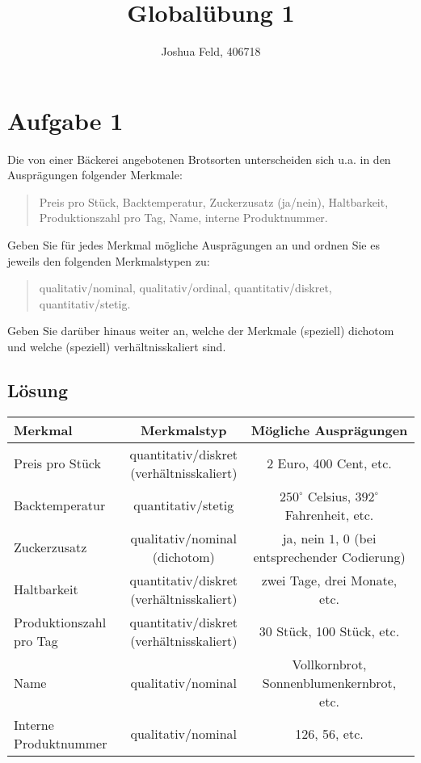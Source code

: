 \documentclass{exercise}
\institute{Institut für Statistik und Wirtschaftsmathematik}
\title{Globalübung 1}
\author{Joshua Feld, 406718}
\begin{document}
    \maketitle


    \section*{Aufgabe 1}

    \begin{problem}
        Die von einer Bäckerei angebotenen Brotsorten unterscheiden sich u.a. in den Ausprägungen folgender Merkmale:
        \begin{quote}
            Preis pro Stück, Backtemperatur, Zuckerzusatz (ja/nein), Haltbarkeit, Produktionszahl pro Tag, Name, interne Produktnummer.
        \end{quote}
        Geben Sie für jedes Merkmal mögliche Ausprägungen an und ordnen Sie es jeweils den folgenden Merkmalstypen zu:
        \begin{quote}
            qualitativ/nominal, qualitativ/ordinal, quantitativ/diskret, quantitativ/stetig.
        \end{quote}
        Geben Sie darüber hinaus weiter an, welche der Merkmale (speziell) dichotom und welche (speziell) verhältnisskaliert sind.
    \end{problem}

    \subsection*{Lösung}
    \begin{center}
        \begin{tabular}{lcc}
            \toprule
            Merkmal & Merkmalstyp & Mögliche Ausprägungen\\
            \midrule
            Preis pro Stück & \makecell{quantitativ/diskret\\(verhältnisskaliert)} & 2 Euro, 400 Cent, etc.\\
            Backtemperatur & quantitativ/stetig & \(250^\circ\) Celsius, \(392^\circ\) Fahrenheit, etc.\\
            Zuckerzusatz & \makecell{qualitativ/nominal\\(dichotom)} & \makecell{ja, nein\\\(1\), \(0\) (bei entsprechender Codierung)}\\
            Haltbarkeit & \makecell{quantitativ/diskret\\(verhältnisskaliert)} & zwei Tage, drei Monate, etc.\\
            Produktionszahl pro Tag & \makecell{quantitativ/diskret\\(verhältnisskaliert)} & 30 Stück, 100 Stück, etc.\\
            Name & qualitativ/nominal & Vollkornbrot, Sonnenblumenkernbrot, etc.\\
            Interne Produktnummer & qualitativ/nominal & 126, 56, etc.\\
            \bottomrule
        \end{tabular}
    \end{center}
\end{document}
